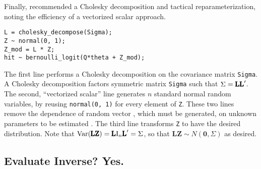 Finally, \cite{Carpenter} recommended a Cholesky decomposition and tactical reparameterization, noting the efficiency of a vectorized scalar approach.
\begin{verbatim}
L = cholesky_decompose(Sigma);  
Z ~ normal(0, 1);  
Z_mod = L * Z; 
hit ~ bernoulli_logit(Q*theta + Z_mod);
\end{verbatim}
The first line performs a Cholesky decomposition on the covariance matrix \verb|Sigma|. A Cholesky decomposition factors symmetric matrix \verb|Sigma| such that $\Sigma = \text{\pmb{LL}}'$. The second, ``vectorized scalar'' line generates $n$ standard normal random variables, by reusing \verb|normal(0, 1)| for every element of \verb|Z|. These two lines remove the dependence of random vector , which must be generated, on unknown parameters to be estimated \cite{Trangucci2017}. The third line transforms \verb|Z| to have the desired distribution. Note that $\text{Var}(\text{\pmb{LZ}}) = \text{\pmb{L}} \text{I}_{n}\text{\pmb{L}}' = \Sigma$, so that $\pmb{LZ} \sim N(\pmb{0}, \Sigma)$ as desired.


\subsection{Evaluate Inverse? Yes.}


